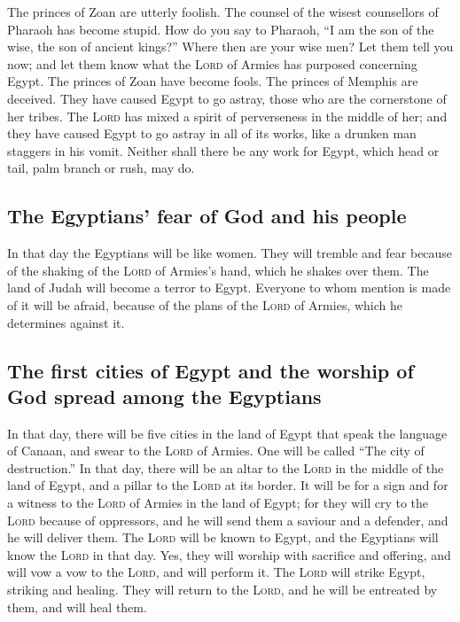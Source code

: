  The princes of Zoan are utterly foolish. The counsel of
the wisest counsellors of Pharaoh has become stupid. How do you say to
Pharaoh, ``I am the son of the wise, the son of ancient kings?''
 Where then are your wise men? Let them tell you now; and
let them know what the \textsc{Lord} of Armies has purposed concerning
Egypt.  The princes of Zoan have become fools. The
princes of Memphis are deceived. They have caused Egypt to go astray,
those who are the cornerstone of her tribes.  The
\textsc{Lord} has mixed a spirit of perverseness in the middle of her;
and they have caused Egypt to go astray in all of its works, like a
drunken man staggers in his vomit.  Neither shall there
be any work for Egypt, which head or tail, palm branch or rush, may do.

\hypertarget{the-egyptians-fear-of-god-and-his-people}{%
\subsection{The Egyptians' fear of God and his
people}\label{the-egyptians-fear-of-god-and-his-people}}

 In that day the Egyptians will be like women. They will
tremble and fear because of the shaking of the \textsc{Lord} of Armies's
hand, which he shakes over them.  The land of Judah will
become a terror to Egypt. Everyone to whom mention is made of it will be
afraid, because of the plans of the \textsc{Lord} of Armies, which he
determines against it.

\hypertarget{the-first-cities-of-egypt-and-the-worship-of-god-spread-among-the-egyptians}{%
\subsection{The first cities of Egypt and the worship of God spread
among the
Egyptians}\label{the-first-cities-of-egypt-and-the-worship-of-god-spread-among-the-egyptians}}

 In that day, there will be five cities in the land of
Egypt that speak the language of Canaan, and swear to the \textsc{Lord}
of Armies. One will be called ``The city of destruction.''
 In that day, there will be an altar to the \textsc{Lord}
in the middle of the land of Egypt, and a pillar to the \textsc{Lord} at
its border.  It will be for a sign and for a witness to
the \textsc{Lord} of Armies in the land of Egypt; for they will cry to
the \textsc{Lord} because of oppressors, and he will send them a saviour
and a defender, and he will deliver them.  The
\textsc{Lord} will be known to Egypt, and the Egyptians will know the
\textsc{Lord} in that day. Yes, they will worship with sacrifice and
offering, and will vow a vow to the \textsc{Lord}, and will perform it.
 The \textsc{Lord} will strike Egypt, striking and
healing. They will return to the \textsc{Lord}, and he will be entreated
by them, and will heal them.

